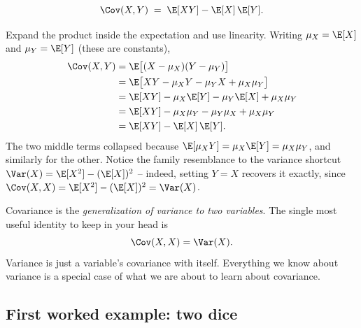 \begin{proposition}
\label{ch14:cov-shortcut}
\[
\Cov(X, Y) \;=\; \E[XY] - \E[X]\,\E[Y].
\]
\end{proposition}

\begin{whybox}
Expand the product inside the expectation and use linearity. Writing
$\mu_X = \E[X]$ and $\mu_Y = \E[Y]$ (these are constants),
\begin{align*}
\Cov(X,Y)
&= \E\big[(X-\mu_X)(Y-\mu_Y)\big] \\
&= \E\big[XY - \mu_X Y - \mu_Y X + \mu_X \mu_Y\big] \\
&= \E[XY] - \mu_X \E[Y] - \mu_Y \E[X] + \mu_X \mu_Y \\
&= \E[XY] - \mu_X \mu_Y - \mu_Y \mu_X + \mu_X \mu_Y \\
&= \E[XY] - \E[X]\,\E[Y].
\end{align*}
The two middle terms collapsed because $\E[\mu_X Y] = \mu_X \E[Y] = \mu_X \mu_Y$,
and similarly for the other. Notice the family resemblance to the variance
shortcut $\Var(X) = \E[X^2] - (\E[X])^2$ -- indeed, setting $Y = X$ recovers it
exactly, since $\Cov(X, X) = \E[X^2] - (\E[X])^2 = \Var(X)$.
\end{whybox}

\begin{focusbox}
Covariance is the \emph{generalization of variance to two variables}. The single
most useful identity to keep in your head is
\[
\Cov(X, X) = \Var(X).
\]
Variance is just a variable's covariance with itself. Everything we know about
variance is a special case of what we are about to learn about covariance.
\end{focusbox}

\subsection{First worked example: two dice}

